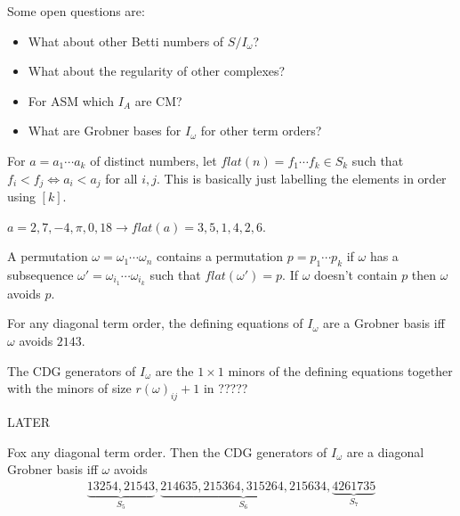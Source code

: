\begin{remark}
    Some open questions are:
    \begin{itemize}
        \item What about other Betti numbers of $S/I_\omega$?
        \item What about the regularity of other complexes?
        \item For ASM which $I_A$ are CM?
        \item What are Grobner bases for $I_\omega$ for other term orders?
    \end{itemize}
\end{remark}

For $a = a_1 \cdots a_k$ of distinct numbers, let $flat(n) = f_1 \cdots f_k \in S_k$ such that $f_i < f_j \iff a_i < a_j$ for all $i,j$. This is basically just labelling the elements in order using $[k]$.

\begin{example}
    $a = 2,7,-4,\pi ,0 ,18 \rightarrow flat(a) = 3,5,1,4,2,6$.
\end{example}

\begin{definition}
    A permutation $\omega = \omega_1 \cdots \omega_n$ contains a permutation $p = p_1 \cdots p_k$ if $\omega$ has a subsequence $\omega ' = \omega_{i_1} \cdots \omega_{i_k}$ such that $flat(\omega ') = p$. If $\omega $ doesn't contain $p$ then $\omega $ avoids $p$.
\end{definition}

\begin{theorem}
    For any diagonal term order, the defining equations of $I_\omega$ are a Grobner basis iff $\omega$ avoids $2143$.
\end{theorem}

\begin{definition}
    The CDG generators of $I_\omega$ are the $1 \times 1$ minors of the defining equations together with the minors of size $r(\omega)_{ij} + 1$ in ?????
\end{definition}

\begin{example}
    LATER
\end{example}

\begin{theorem}
    Fox any diagonal term order. Then the CDG generators of $I_\omega$ are a diagonal Grobner basis iff $\omega $ avoids
    \begin{align*}
        \underbrace{13254, 21543}_{S_5} , \underbrace{214635 , 215364, 315264, 215634 }_{S_6} , \underbrace{4261735}_{S_7}
    \end{align*}
\end{theorem}

